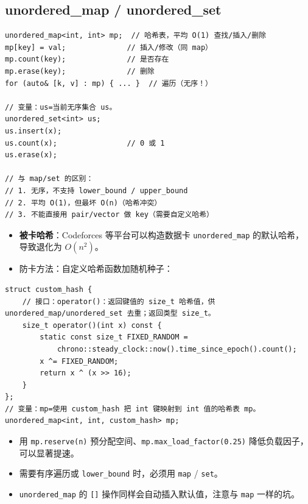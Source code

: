 \documentclass[UTF8,openany,oneside,zihao=-4]{ctexbook}
\begin{document}
\subsection{unordered\_map / unordered\_set}
\begin{lstlisting}
unordered_map<int, int> mp;  // 哈希表，平均 O(1) 查找/插入/删除
mp[key] = val;              // 插入/修改（同 map）
mp.count(key);              // 是否存在
mp.erase(key);              // 删除
for (auto& [k, v] : mp) { ... }  // 遍历（无序！）

// 变量：us=当前无序集合 us。
unordered_set<int> us;
us.insert(x);
us.count(x);                // 0 或 1
us.erase(x);

// 与 map/set 的区别：
// 1. 无序，不支持 lower_bound / upper_bound
// 2. 平均 O(1)，但最坏 O(n)（哈希冲突）
// 3. 不能直接用 pair/vector 做 key（需要自定义哈希）
\end{lstlisting}

\begin{warn}
\begin{itemize}
  \item \textbf{被卡哈希}：Codeforces 等平台可以构造数据卡 \lstinline|unordered_map| 的默认哈希，导致退化为 $O(n^2)$。
  \item 防卡方法：自定义哈希函数加随机种子：
\end{itemize}
\end{warn}

\begin{lstlisting}
struct custom_hash {
    // 接口：operator()：返回键值的 size_t 哈希值，供 unordered_map/unordered_set 去重；返回类型 size_t。
    size_t operator()(int x) const {
        static const size_t FIXED_RANDOM =
            chrono::steady_clock::now().time_since_epoch().count();
        x ^= FIXED_RANDOM;
        return x ^ (x >> 16);
    }
};
// 变量：mp=使用 custom_hash 把 int 键映射到 int 值的哈希表 mp。
unordered_map<int, int, custom_hash> mp;
\end{lstlisting}

\begin{tip}
\begin{itemize}
  \item 用 \lstinline|mp.reserve(n)| 预分配空间、\lstinline|mp.max_load_factor(0.25)| 降低负载因子，可以显著提速。
  \item 需要有序遍历或 \lstinline|lower_bound| 时，必须用 \lstinline|map| / \lstinline|set|。
  \item \lstinline|unordered_map| 的 \lstinline|[]| 操作同样会自动插入默认值，注意与 \lstinline|map| 一样的坑。
\end{itemize}
\end{tip}
\end{document}
